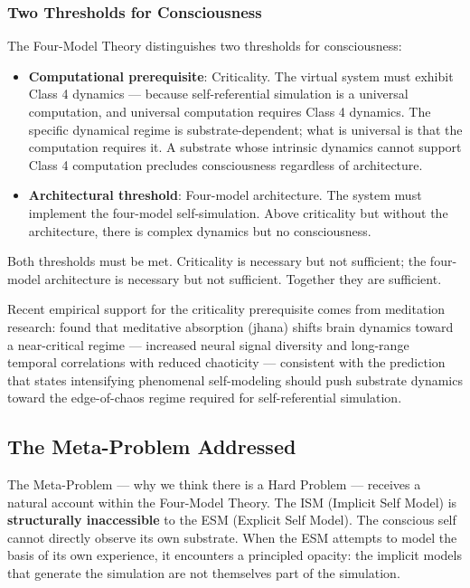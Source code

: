 \documentclass[12pt]{article}
\newcommand{\revstart}{}
\newcommand{\revend}{}
\begin{document}
\subsubsection{Two Thresholds for Consciousness}

The Four-Model Theory distinguishes two thresholds for consciousness:
\begin{itemize}
\item \textbf{Computational prerequisite}: Criticality. The virtual system must exhibit Class 4 dynamics --- because self-referential simulation is a universal computation, and universal computation requires Class 4 dynamics. The specific dynamical regime is substrate-dependent; what is universal is that the computation requires it. A substrate whose intrinsic dynamics cannot support Class 4 computation precludes consciousness regardless of architecture.
\item \textbf{Architectural threshold}: Four-model architecture. The system must implement the four-model self-simulation. Above criticality but without the architecture, there is complex dynamics but no consciousness.
\end{itemize}

Both thresholds must be met. Criticality is necessary but not sufficient; the four-model architecture is necessary but not sufficient. Together they are sufficient.

{\revstart Recent empirical support for the criticality prerequisite comes from meditation research: \citet{Mago2026} found that meditative absorption (jhana) shifts brain dynamics toward a near-critical regime --- increased neural signal diversity and long-range temporal correlations with reduced chaoticity --- consistent with the prediction that states intensifying phenomenal self-modeling should push substrate dynamics toward the edge-of-chaos regime required for self-referential simulation.\revend}


\subsection{The Meta-Problem Addressed}


The Meta-Problem --- why we think there is a Hard Problem --- receives a natural account within the Four-Model Theory. The ISM (Implicit Self Model) is \textbf{structurally inaccessible} to the ESM (Explicit Self Model). The conscious self cannot directly observe its own substrate. When the ESM attempts to model the basis of its own experience, it encounters a principled opacity: the implicit models that generate the simulation are not themselves part of the simulation.
\end{document}
